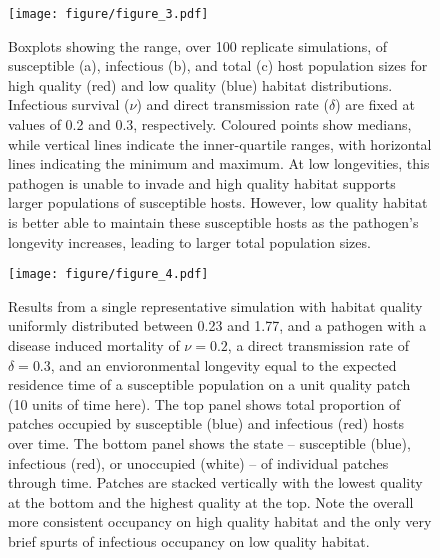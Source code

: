 \documentclass{article}
\begin{document}
\begin{figure}
\texttt{[image: figure/figure\_3.pdf]}
\centering
\caption{Boxplots showing the range, over 100 replicate simulations, of susceptible (a), infectious (b), and total (c) host population sizes for high quality (red) and low quality (blue) habitat distributions.  Infectious survival ($\nu$) and direct transmission rate ($\delta$) are fixed at values of 0.2 and 0.3, respectively.  Coloured points show medians, while vertical lines indicate the inner-quartile ranges, with horizontal lines indicating the minimum and maximum.  At low longevities, this pathogen is unable to invade and high quality habitat supports larger populations of susceptible hosts.  However, low quality habitat is better able to maintain these susceptible hosts as the pathogen's longevity increases, leading to larger total population sizes.}
\label{popsizes}
\end{figure}

\begin{figure}
\texttt{[image: figure/figure\_4.pdf]}
\centering
\caption{Results from a single representative simulation with habitat quality uniformly distributed between 0.23 and 1.77, and a pathogen with a disease induced mortality of $\nu = 0.2$, a direct transmission rate of $\delta = 0.3$, and an envioronmental longevity equal to the expected residence time of a susceptible population on a unit quality patch (10 units of time here).  The top panel shows total proportion of patches occupied by susceptible (blue) and infectious (red) hosts over time.  The bottom panel shows the state -- susceptible (blue), infectious (red), or unoccupied (white) -- of individual patches through time.  Patches are stacked vertically with the lowest quality at the bottom and the highest quality at the top.  Note the overall more consistent occupancy on high quality habitat and the only very brief spurts of infectious occupancy on low quality habitat.}
\label{simvis}
\end{figure}

\clearpage
\end{document}
